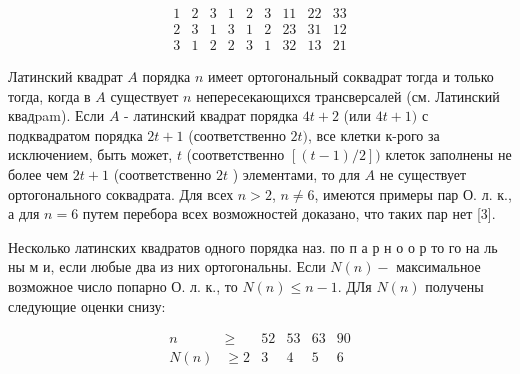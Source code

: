 \documentclass[10pt]{article}
\begin{document}
\[
\begin{array}{lllllllll}
1 & 2 & 3 & 1 & 2 & 3 & 11 & 22 & 33 \\
2 & 3 & 1 & 3 & 1 & 2 & 23 & 31 & 12 \\
3 & 1 & 2 & 2 & 3 & 1 & 32 & 13 & 21
\end{array}
\]

Латинский квадрат $A$ порядка $n$ имеет ортогональный соквадрат тогда и только тогда, когда в $A$ существует $n$ непересекающихся трансверсалей (см. Латинский квадpam). Если $A$ - латинский квадрат порядка $4 t+2$ (или $4 t+1)$ с подквадратом порядка $2 t+1$ (соответственно $2 t)$, все клетки к-рого за исключением, быть может, $t$ (соответственно $[(t-1) / 2])$ клеток заполнены не более чем $2 t+1$ (соответственно $2 t$ ) элементами, то для $A$ не существует ортогонального соквадрата. Для всех $n>2$, $n \neq 6$, имеются примеры пар О. л. к., а для $n=6$ путем перебора всех возможностей доказано, что таких пар нет [3].

Несколько латинских квадратов одного порядка наз. по п а р н о о р то го на ль ны м и, если любые два из них ортогональны. Если $N(n)-$ максимальное возможное число попарно О. л. к., то $N(n) \leqslant n-1$. ДЛя $N(n)$ получены следующие оценки снизу:

\[
\begin{array}{rrrrrr}
n & \geqslant & 52 & 53 & 63 & 90 \\
N(n) & \geqslant 2 & 3 & 4 & 5 & 6
\end{array}
\]
\end{document}

